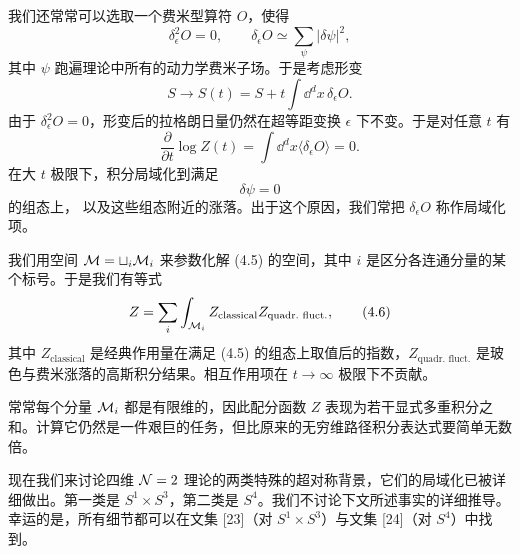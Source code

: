 我们还常常可以选取一个费米型算符 $O$，使得
\begin{equation}
\delta_\epsilon^2 O=0,\qquad \delta_\epsilon O\simeq\sum_\psi|\delta\psi|^2,
\tag{4.2}
\end{equation}
其中 $\psi$ 跑遍理论中所有的动力学费米子场。于是考虑形变
\begin{equation}
S\to S(t)=S+t\int\dd^d x\,\delta_\epsilon O.
\tag{4.3}
\end{equation}
由于 $\delta_\epsilon^2O=0$，形变后的拉格朗日量仍然在超等距变换 $\epsilon$ 下不变。于是对任意 $t$ 有
\begin{equation}
\frac{\partial}{\partial t}\log Z(t)=\int\dd^d x\langle\delta_\epsilon O\rangle=0.
\tag{4.4}
\end{equation}
在大 $t$ 极限下，积分局域化到满足
\begin{equation}
\delta\psi=0
\tag{4.5}
\end{equation}
的组态上，
以及这些组态附近的涨落。出于这个原因，我们常把 $\delta_\epsilon O$ 称作局域化项。


我们用空间 $\mathcal{M}=\sqcup_i\mathcal{M}_i$ 来参数化解 (4.5) 的空间，其中 $i$ 是区分各连通分量的某个标号。于是我们有等式
\begin{equation}
Z=\sum_i\int_{\cM_i}Z_{\text{classical}}Z_{\text{quadr.\ fluct.}},
\tag{4.6}
\end{equation}
其中 $Z_{\text{classical}}$ 是经典作用量在满足 (4.5) 的组态上取值后的指数，$Z_{\text{quadr.\ fluct.}}$ 是玻色与费米涨落的高斯积分结果。相互作用项在 $t\to\infty$ 极限下不贡献。

常常每个分量 $\mathcal{M}_i$ 都是有限维的，因此配分函数 $Z$ 表现为若干显式多重积分之和。计算它仍然是一件艰巨的任务，但比原来的无穷维路径积分表达式要简单无数倍。

现在我们来讨论四维 $\mathcal{N}=2$ 理论的两类特殊的超对称背景，它们的局域化已被详细做出。第一类是 $S^1\times S^3$，第二类是 $S^4$。我们不讨论下文所述事实的详细推导。幸运的是，所有细节都可以在文集 [23]（对 $S^1\times S^3$）与文集 [24]（对 $S^4$）中找到。

